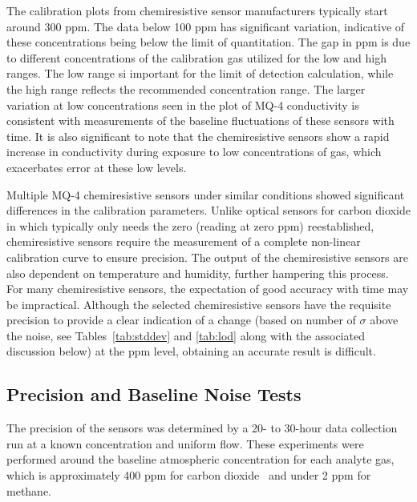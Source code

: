 \documentclass[times]{joehreview}
\begin{document}
	The calibration plots from chemiresistive sensor manufacturers typically start around 300 ppm.  The data below 100 ppm has significant variation, indicative of these concentrations being below the limit of quantitation.  The gap in ppm is due to different concentrations of the calibration gas utilized for the low and high ranges.  The low range si important for the limit of detection calculation, while the high range reflects the recommended concentration range. The larger variation at low concentrations seen in the plot of MQ-4 conductivity is consistent with measurements of the baseline fluctuations of these sensors with time.  It is also significant to note that the chemiresistive sensors show a rapid increase in conductivity during exposure to low concentrations of gas, which exacerbates error at these low levels.
	
	Multiple MQ-4 chemiresistive sensors under similar conditions showed significant differences in the calibration parameters.  Unlike optical sensors for carbon dioxide in which typically only needs the zero (reading at zero ppm) reestablished, chemiresistive sensors require the measurement of a complete non-linear calibration curve to ensure precision.  The output of the chemiresistive sensors are also dependent on temperature and humidity, further hampering this process.~\cite{benkstein_analytical_2014}  For many chemiresistive sensors, the expectation of good accuracy with time may be impractical.  Although the selected chemiresistive sensors have the requisite precision to provide a clear indication of a change (based on number of $\sigma$ above the noise, see Tables~\ref{tab:stddev} and \ref{tab:lod} along with the associated discussion below) at the ppm level, obtaining an accurate result is difficult.
	
	\subsection*{Precision and Baseline Noise Tests}
	\label{sec:method_baseline}
	The precision of the sensors was determined by a 20- to 30-hour data collection run at a known concentration and uniform flow.  These experiments were performed around the baseline atmospheric concentration for each analyte gas, which is approximately 400 ppm for carbon dioxide~\cite{blasing_recent_2016,dlugokencky_trends_2016} and under 2 ppm for methane.~\cite{turner_large_2016,bamberger_spatial_2014,dlugokencky_trends_2016-1} 
	
\end{document}
